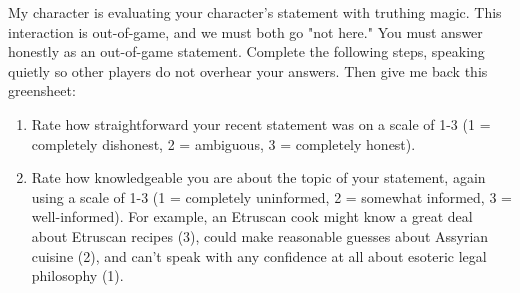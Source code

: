\documentclass[green]{Kos}
\begin{document}
\name{\gTruthing{}}

My character is evaluating your character's statement with truthing magic. This interaction is out-of-game, and we must both go "not here." You must answer honestly as an out-of-game statement.
Complete the following steps, speaking quietly so other players do not overhear your answers. Then give me back this greensheet:

\begin{enumerate}
\item Rate how straightforward your recent statement was on a scale of 1-3 (1 = completely dishonest, 2 = ambiguous, 3 = completely honest). 
\item Rate how knowledgeable you are about the topic of your statement, again using a scale of 1-3 (1 = completely uninformed, 2 =  somewhat informed, 3 = well-informed). For example, an Etruscan cook might know a great deal about Etruscan recipes (3), could make reasonable guesses about Assyrian cuisine (2), and can't speak with any confidence at all about esoteric legal philosophy (1).
\end{enumerate}
\end{document}
